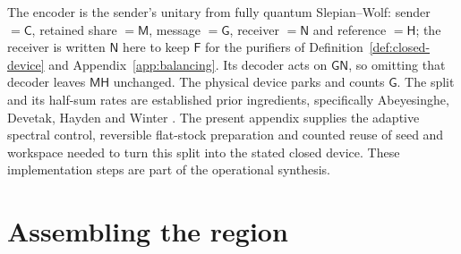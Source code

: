 \documentclass[11pt,a4paper]{article}
\numberwithin{equation}{section}
\theoremstyle{plain}
\theoremstyle{definition}
\newcommand{\rg}[1]{\mathsf{#1}}
\begin{document}
The encoder is the sender's unitary from fully quantum Slepian--Wolf:
sender $=\rg{C}$, retained share $=\rg{M}$, message $=\rg{G}$, receiver
$=\rg{N}$ and reference $=\rg{H}$; the receiver is written $\rg{N}$ here to
keep $\rg{F}$ for the purifiers of Definition~\ref{def:closed-device} and
Appendix~\ref{app:balancing}. Its decoder acts on $\rg{G}\rg{N}$, so omitting
that decoder leaves $\rg{M}\rg{H}$ unchanged. The physical device
parks and counts $\rg{G}$. The split and its half-sum rates are established
prior ingredients, specifically Abeyesinghe, Devetak, Hayden and Winter
\cite[Theorems IV.1--IV.2, Lemma IV.5 and Eq.~(30), pp.~6--9, with the
asymptotic rate choice following Eq.~(35) in section VII]{Abeyesinghe2009}.
The present appendix supplies the adaptive spectral control, reversible
flat-stock preparation and counted reuse of seed and workspace needed to turn
this split into the stated closed device. These implementation steps are part
of the operational synthesis.

\section{Assembling the region}
\label{sec:region}
\end{document}
